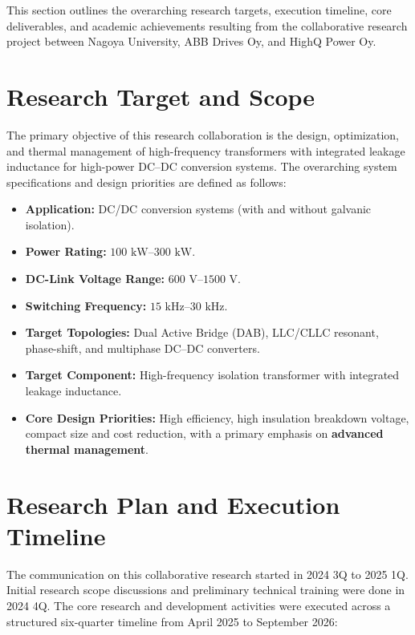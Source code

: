 
This section outlines the overarching research targets, execution timeline, core deliverables, and academic achievements resulting from the collaborative research project between Nagoya University, ABB Drives Oy, and HighQ Power Oy.

\section*{Research Target and Scope}
The primary objective of this research collaboration is the design, optimization, and thermal management of high-frequency transformers with integrated leakage inductance for high-power DC--DC conversion systems. The overarching system specifications and design priorities are defined as follows:
\begin{singlespace}
    \begin{itemize}
    \item \textbf{Application:} DC/DC conversion systems (with and without galvanic isolation).
    \item \textbf{Power Rating:} $100\text{ kW}\text{--}300\text{ kW}$.
    \item \textbf{DC-Link Voltage Range:} $600\text{ V}\text{--}1500\text{ V}$.
    \item \textbf{Switching Frequency:} $15\text{ kHz}\text{--}30\text{ kHz}$.
    \item \textbf{Target Topologies:} Dual Active Bridge (DAB), LLC/CLLC resonant, phase-shift, and multiphase DC--DC converters.
    \item \textbf{Target Component:} High-frequency isolation transformer with integrated leakage inductance.
    \item \textbf{Core Design Priorities:} High efficiency, high insulation breakdown voltage, compact size and cost reduction, with a primary emphasis on \textbf{advanced thermal management}.
\end{itemize}
\end{singlespace}


\section*{Research Plan and Execution Timeline}
The communication on this collaborative research started in 2024 3Q to 2025 1Q. Initial research scope discussions and preliminary technical training were done in 2024 4Q. The core research and development activities were executed across a structured six-quarter timeline from April 2025 to September 2026:


